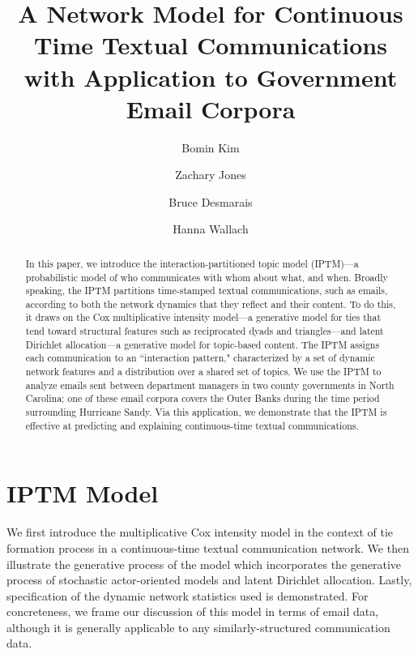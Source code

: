 \documentclass[a4paper]{article}
\title{A Network Model for Continuous Time Textual Communications\\ with Application to Government Email Corpora}
\author[1]{Bomin Kim}
\author[1]{Zachary Jones}
\author[1]{Bruce Desmarais}
\author[2,3]{Hanna Wallach}
\affil[1]{Pennsylvania State University}
\affil[2]{Microsoft Research NYC}
\affil[3]{University of Massachusetts Amherst}
\begin{document}
\maketitle
\begin{abstract}
	
	\noindent In this paper, we introduce the interaction-partitioned topic model
	(IPTM)---a probabilistic model of who communicates with whom about
	what, and when. Broadly speaking, the IPTM partitions time-stamped
	textual communications, such as emails, according to both the network
	dynamics that they reflect and their content. To do this, it draws on
	the Cox multiplicative intensity model---a generative model for ties
	that tend toward structural features such as reciprocated dyads and
	triangles---and latent Dirichlet allocation---a generative model for
	topic-based content. The IPTM assigns each communication to an
	``interaction pattern," characterized by a set of dynamic network
	features and a distribution over a shared set of topics. We use the
	IPTM to analyze emails sent between department managers in two county
	governments in North Carolina; one of these email corpora covers the
	Outer Banks during the time period surrounding Hurricane Sandy. Via
	this application, we demonstrate that the IPTM is effective at
	predicting and explaining continuous-time textual communications.	
\end{abstract}
\section{IPTM Model}
We first introduce the multiplicative Cox intensity model in the context of tie formation process in a continuous-time textual communication network. We then illustrate the generative process of the model which incorporates the generative process of stochastic actor-oriented models and latent Dirichlet allocation. Lastly, specification of the dynamic network statistics used is demonstrated. For concreteness, we frame our discussion of this model in terms of email data, although it is generally applicable to any similarly-structured communication data.
\end{document}

